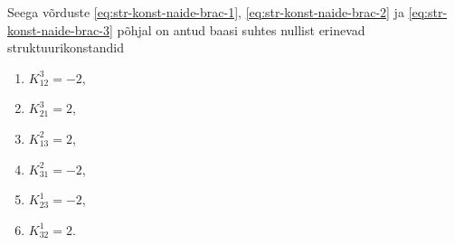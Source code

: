 \begin{naide}
    Seega võrduste \eqref{eq:str-konst-naide-brac-1},
    \eqref{eq:str-konst-naide-brac-2} ja \eqref{eq:str-konst-naide-brac-3}
    põhjal on antud baasi suhtes nullist erinevad struktuurikonstandid
    \begin{multicols}{3}
        \begin{enumerate}
            \item $K_{12}^{3} = -2$,
            \item $K_{21}^{3} = 2$,
            \item $K_{13}^{2} = 2$,
            \item $K_{31}^{2} = -2$,
            \item $K_{23}^{1} = -2$,
            \item $K_{32}^{1} = 2$.
        \end{enumerate}
    \end{multicols}


\end{naide}
